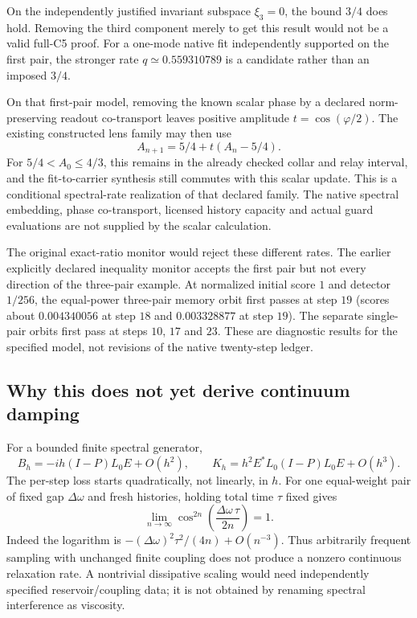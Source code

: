 \documentclass[11pt,a4paper]{article}
\begin{document}
On the independently justified invariant subspace $\xi_3=0$, the
bound $3/4$ does hold. Removing the third component merely to get
this result would not be a valid full-C5 proof. For a one-mode native
fit independently supported on the first pair, the stronger rate
$q\simeq0.559310789$ is a candidate rather than an imposed $3/4$.

On that first-pair model, removing the known scalar phase by a
declared norm-preserving readout co-transport leaves positive
amplitude $t=\cos(\varphi/2)$. The existing constructed lens family
may then use
\[
 A_{n+1}=5/4+t(A_n-5/4).
\]
For $5/4<A_0\le4/3$, this remains in the already checked collar and
relay interval, and the fit-to-carrier synthesis still commutes with
this scalar update. This is a conditional spectral-rate realization
of that declared family. The native spectral embedding, phase
co-transport, licensed history capacity and actual guard evaluations
are not supplied by the scalar calculation.

The original exact-ratio monitor would reject these different rates.
The earlier explicitly declared inequality monitor accepts the first
pair but not every direction of the three-pair example. At normalized
initial score $1$ and detector $1/256$, the equal-power three-pair
memory orbit first passes at step $19$ (scores about $0.004340056$
at step $18$ and $0.003328877$ at step $19$). The separate single-pair
orbits first pass at steps $10$, $17$ and $23$. These are diagnostic
results for the specified model, not revisions of the native
twenty-step ledger.

\subsection{Why this does not yet derive continuum damping}
For a bounded finite spectral generator,
\[
 B_h=-ih(I-P)L_0E+O(h^2),\qquad
 K_h=h^2E^*L_0(I-P)L_0E+O(h^3).
\]
The per-step loss starts quadratically, not linearly, in $h$.
For one equal-weight pair of fixed gap $\Delta\omega$ and fresh
histories, holding total time $\tau$ fixed gives
\[
 \lim_{n\to\infty}
 \cos^{2n}\!\left(\frac{\Delta\omega\,\tau}{2n}\right)=1.
\]
Indeed the logarithm is
$-(\Delta\omega)^2\tau^2/(4n)+O(n^{-3})$. Thus arbitrarily frequent
sampling with unchanged finite coupling does not produce a nonzero
continuous relaxation rate. A nontrivial dissipative scaling would
need independently specified reservoir/coupling data; it is not
obtained by renaming spectral interference as viscosity.
\end{document}
